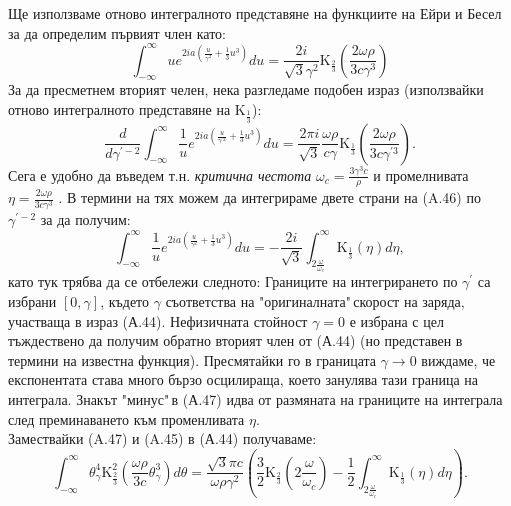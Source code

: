 \begin{appendices}
\begin{equation}
\end{equation}
Ще използваме отново интегралното представяне на функциите на Ейри и Бесел за да определим първият член като:
\begin{equation}
	\int_{-\infty}^\infty u e^{2ia\left(\frac{u}{\gamma^2} + \frac{1}{3}u^3\right)}du = \frac{2i}{\sqrt{3}\gamma^2}\text{K}_{\frac{2}{3}}\left(\frac{2\omega\rho}{3c\gamma^3}\right)
\end{equation}
За да пресметнем вторият челен, нека разгледаме подобен израз (използвайки отново интегралното представяне на $\text{K}_{\frac{1}{3}}$):
\begin{equation}
	\frac{d}{d\gamma^{\prime-2}}\int_{-\infty}^{\infty}\frac{1}{u}e^{2ia\left(\frac{u}{\gamma^{\prime2}} + \frac{1}{3}u^3\right)}du = \frac{2\pi i}{\sqrt{3}}\frac{\omega\rho}{c\gamma}\text{K}_{\frac{1}{3}}\left(\frac{2\omega\rho}{3c\gamma^{\prime3}}\right).
\end{equation}
Сега е удобно да въведем т.н. \emph{критична честота} $\omega_c = \frac{3\gamma^3c}{\rho}$ и промелнивата $\eta = \frac{2\omega\rho}{3c\gamma^3}$ . В термини на тях можем да интегрираме двете страни на (A.46) по $\gamma^{\prime-2}$ за да получим:
\begin{equation}
\int_{-\infty}^{\infty}\frac{1}{u}e^{2ia\left(\frac{u}{\gamma^2} + \frac{1}{3}u^3\right)}du = -\frac{2i}{\sqrt{3}}\int_{2\frac{\omega}{\omega_c}}^{\infty} \text{K}_{\frac{1}{3}}(\eta)d\eta,
\end{equation}
като тук трябва да се отбележи следното: Границите на интегрирането по $\gamma^\prime$ са избрани $[0, \gamma]$, където $\gamma$ съответства на "оригиналната"$\,$скорост на заряда, участваща в израз (А.44). Нефизичната стойност $\gamma = 0$ е избрана с цел тъждествено да получим обратно вторият член от (А.44) (но представен в термини на известна функция). Пресмятайки го в границата $\gamma\rightarrow 0$ виждаме, че експонентата става много бързо осцилираща, което занулява тази граница на интеграла. Знакът "минус"$\,$в (А.47) идва от размяната на границите на интеграла след преминаването към променливата $\eta$.\\
Замествайки (A.47) и (A.45) в (А.44) получаваме:
\begin{equation}
		\int_{-\infty}^\infty \theta_\gamma^4 \text{K}^2_{\frac{2}{3}}\left(\frac{\omega\rho}{3 c}\theta_\gamma^3\right)d\theta = \frac{\sqrt{3}\pi c}{\omega\rho\gamma^2}\left(\frac{3}{2}\text{K}_{\frac{2}{3}}\left(2\frac{\omega}{\omega_c}\right) - \frac{1}{2}\int_{2\frac{\omega}{\omega_c}}^{\infty} \text{K}_{\frac{1}{3}}(\eta)d\eta\right).

\end{equation}
\end{appendices}
